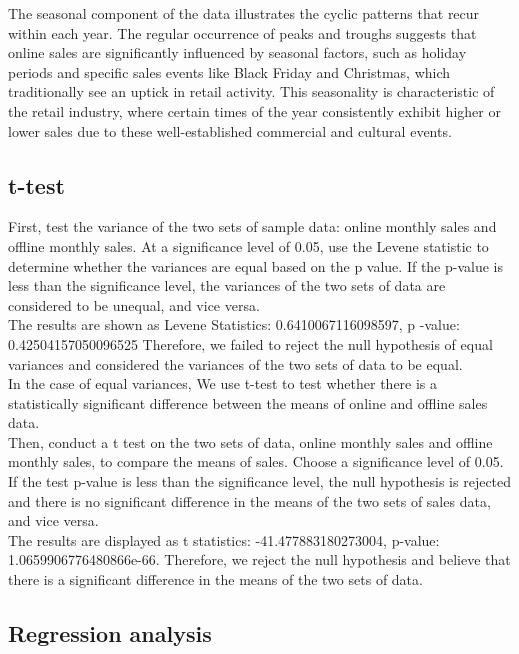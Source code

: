 \documentclass{article}
\begin{document}
The seasonal component of the data illustrates the cyclic patterns that recur within each year. The regular occurrence of peaks and troughs suggests that online sales are significantly influenced by seasonal factors, such as holiday periods and specific sales events like Black Friday and Christmas, which traditionally see an uptick in retail activity. This seasonality is characteristic of the retail industry, where certain times of the year consistently exhibit higher or lower sales due to these well-established commercial and cultural events.

\subsection{t-test}
First, test the variance of the two sets of sample data: online monthly sales and offline monthly sales. At a significance level of 0.05, use the Levene statistic to determine whether the variances are equal based on the p value. If the p-value is less than the significance level, the variances of the two sets of data are considered to be unequal, and vice versa.
\\The results are shown as Levene Statistics: 0.6410067116098597, p -value: 0.42504157050096525
Therefore, we failed to reject the null hypothesis of equal variances and considered the variances of the two sets of data to be equal.
\\In the case of equal variances, We use t-test to test whether there is a statistically significant difference between the means of online and offline sales data.
\\Then, conduct a t test on the two sets of data, online monthly sales and offline monthly sales, to compare the means of sales. Choose a significance level of 0.05. If the test p-value is less than the significance level, the null hypothesis is rejected and there is no significant difference in the means of the two sets of sales data, and vice versa.
\\The results are displayed as t statistics: -41.477883180273004, p-value: 1.0659906776480866e-66. Therefore, we reject the null hypothesis and believe that there is a significant difference in the means of the two sets of data.

\subsection{Regression analysis}
\end{document}
